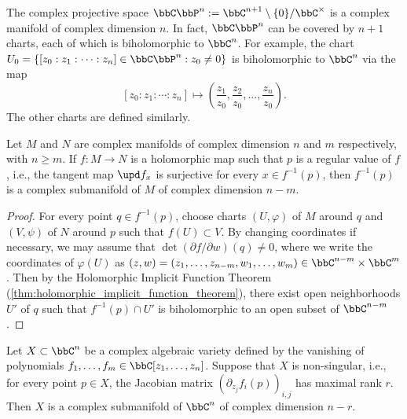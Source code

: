     \begin{example}\label{eg:complex_projective_space_as_complex_manifold}
        The complex projective space \(\bbC\bbP^n:= \bbC^{n+1}\setminus \{0\}/\bbC^\times\) is a complex manifold of complex dimension \(n\).
        In fact, \(\bbC\bbP^n\) can be covered by \(n+1\) charts, each of which is biholomorphic to \(\bbC^n\).
        For example, the chart \(U_0 = \{[z_0: z_1: \cdots: z_n]\in \bbC\bbP^n: z_0\neq 0\}\) is biholomorphic to \(\bbC^n\) via the map
        \[
            [z_0: z_1: \cdots: z_n] \mapsto \left(\frac{z_1}{z_0}, \frac{z_2}{z_0}, \ldots, \frac{z_n}{z_0}\right).
        \]
        The other charts are defined similarly.
    \end{example}

    \begin{proposition}\label{prop:complex_submanifold_by_holomorphic_implicit_function_theorem}
        Let \(M\) and \(N\) are complex manifolds of complex dimension \(n\) and \(m\) respectively, with \(n \geq m\).
        If \(f: M\to N\) is a holomorphic map such that \(p\) is a regular value of \(f\), 
        i.e., the tangent map \(\upd f_x\) is surjective for every \(x\in f^{-1}(p)\),
        then \(f^{-1}(p)\) is a complex submanifold of \(M\) of complex dimension \(n - m\).
    \end{proposition}
    \begin{proof}
        For every point \(q\in f^{-1}(p)\), choose charts \((U,\varphi)\) of \(M\) around \(q\) and \((V,\psi)\) of \(N\) around \(p\) such that \(f(U) \subset V\).
        By changing coordinates if necessary, we may assume that \(\det(\partial f/\partial w)(q) \neq 0\),
        where we write the coordinates of \(\varphi(U)\) as \((z,w) = (z_1, \ldots, z_{n-m}, w_1, \ldots, w_m) \in \bbC^{n-m} \times \bbC^m\).
        Then by the Holomorphic Implicit Function Theorem (\cref{thm:holomorphic_implicit_function_theorem}),
        there exist open neighborhoods \(U'\) of \(q\) such that \(f^{-1}(p)\cap U'\) is biholomorphic to an open subset of \(\bbC^{n-m}\).
    \end{proof}

    \begin{example}\label{eg:non_singular_complex_algebraic_variety_as_complex_manifold}
        Let \(X \subset \bbC^n\) be a complex algebraic variety defined by the vanishing of polynomials \(f_1, \ldots, f_m \in \bbC[z_1, \ldots, z_n]\).
        Suppose that \(X\) is non-singular, i.e., for every point \(p\in X\), the Jacobian matrix \(\left( \partial_{z_j}f_i(p) \right)_{i,j}\) has maximal rank \(r\).
        Then \(X\) is a complex submanifold of \(\bbC^n\) of complex dimension \(n - r\).
    \end{example}

